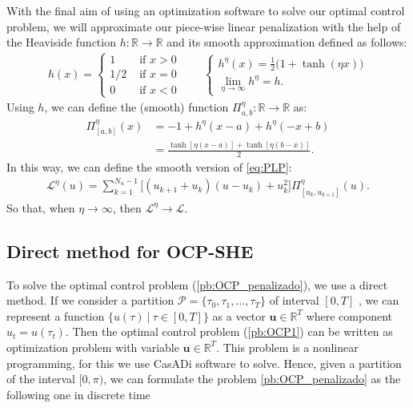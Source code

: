\documentclass[twocolumn]{autart}    %
\begin{document}
With the final aim of using an optimization software to solve our optimal control problem, we will approximate our piece-wise linear penalization with the help of the Heaviside function $h:\mathbb{R} \rightarrow \mathbb{R}$ and its smooth approximation defined as follows: 
\begin{align*}
    h(x) = \begin{cases}
        1 & \text{ if } x > 0 \\
		1/2 & \text{ if } x = 0\\
		 0 & \text{ if } x < 0
    \end{cases}    
    \hspace{2em} 
    \begin{cases}
        \displaystyle h^\eta(x) = \frac 12\big(1 + \tanh(\eta x)\big) \\[7pt] \displaystyle \lim_{\eta\to\infty} h^\eta = h.
    \end{cases}
\end{align*}
Using $h$, we can define the (smooth) function $\Pi_{a,b}^\eta:\mathbb{R} \rightarrow \mathbb{R}$ as:
\begin{align*}
    \Pi_{[a,b]}^\eta(x) &= - 1 + h^\eta(x-a) + h^\eta(-x+b) 
    \\[5pt]
    &= \frac{\tanh[\eta( x -a)] + \tanh[\eta (b-x)]}{2}.
\end{align*}
In this way, we can define the smooth version of \eqref{eq:PLP}:
\begin{align*}
    \mathcal{L}^\eta(u) = \sum_{k = 1}^{N_u-1} \big[ (u_{k+1}+u_{k}) (u-u_k) + u_k^2 \big] \Pi^\eta_{[u_k,u_{k+1}]}(u).
\end{align*}
So that, when $\eta \rightarrow \infty$, then $\mathcal{L}^\eta \rightarrow \mathcal{L}$. 

\subsection{Direct method  for  OCP-SHE}

To solve the optimal control problem (\ref{pb:OCP_penalizado}), we use a direct method. 
%
If we consider a partition $\mathcal{P} = \{\tau_0,\tau_1,\dots,\tau_{T}\}$ of interval $[0,T]$ , we can represent a function $\{ u(\tau) \ | \ \tau \in [0,T]\}$ as a vector $\bm{u} \in \mathbb{R}^{T}$ where component $u_t = u(\tau_t)$.  
%
Then the optimal control problem (\ref{pb:OCP1}) can be written as optimization problem with variable $\bm{u} \in \mathbb{R}^{T}$. This problem is a nonlinear programming, for this we use CasADi software to solve. 
%
Hence, given a partition of the interval $[0,\pi)$, we can formulate the problem \ref{pb:OCP_penalizado} as the following one in discrete time
\newline
\end{document}
